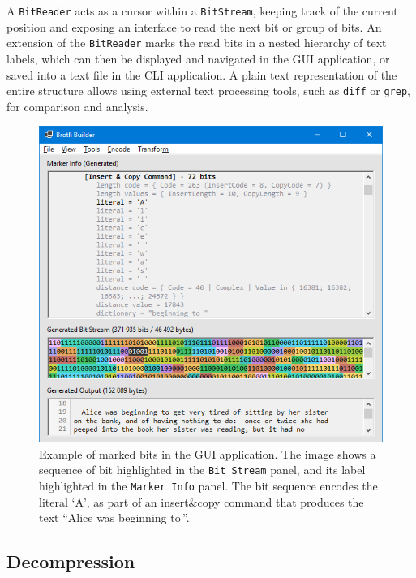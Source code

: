 \documentclass[english,master,dept460,male,cpp,cpdeclaration]{diploma}
\begin{document}
	A \verb|BitReader| acts as a cursor within a \verb|BitStream|, keeping track of the current position and exposing an interface to read the next bit or group of bits. An extension of the \verb|BitReader| marks the read bits in a nested hierarchy of text labels, which can then be displayed and navigated in the GUI application, or saved into a text file in the CLI application. A plain text representation of the entire structure allows using external text processing tools, such as \verb|diff| or \verb|grep|, for comparison and analysis.
	
	\begin{figure}[H]
		\includegraphics{Figures/ExampleBitMarkerGUI.png}
		\caption[Example of marked bits in the GUI application.]{Example of marked bits in the GUI application. The image shows a sequence of bit highlighted in the \texttt{Bit Stream} panel, and its label highlighted in the \texttt{Marker Info} panel. The bit sequence encodes the literal \enquote*{A}, as part of an insert\&copy command that produces the text \enquote{Alice\,\textvisiblespace \,was\,\textvisiblespace \,beginning\,\textvisiblespace \,to\,\textvisiblespace}.}
	\end{figure}
	
	\subsection{Decompression}
	
\end{document}
